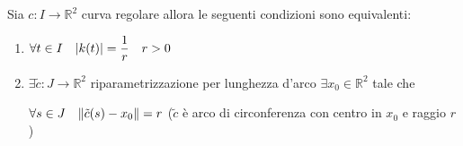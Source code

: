         \newpage
        \begin{proposizione}
        \label{prop:curvatura_costante_circonferenza}
        Sia $c \colon I \to \mathbb{R}^2$ curva regolare allora le seguenti condizioni sono equivalenti:
        \begin{enumerate}
            \item $\displaystyle \forall t \in I \quad \lvert k(t)\rvert = \frac{1}{r} \quad r>0$
            \item $\exists \tilde{c} \colon J \to \mathbb{R}^2$ riparametrizzazione per lunghezza d'arco $\exists x_0 \in \mathbb{R}^2$ tale che 
            
            $\forall s \in J \quad \lVert\tilde{c}(s) - x_0\rVert = r$ \textcolor{blu}{($\tilde{c}$ è arco di circonferenza con centro in $x_0$ e raggio $r$)}
        \end{enumerate}
        \end{proposizione}
